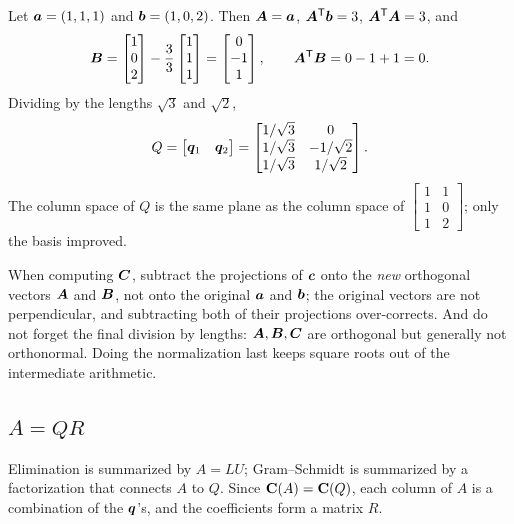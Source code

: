 \begin{example}\label{ex:u19-lecture}
Let $\boldsymbol{a}=(1,1,1)$ and $\boldsymbol{b}=(1,0,2)$. Then $\boldsymbol{A}=\boldsymbol{a}$, $\boldsymbol{A}^{\mathsf{T}}\boldsymbol{b}=3$,
$\boldsymbol{A}^{\mathsf{T}}\boldsymbol{A}=3$, and
\[
  \boldsymbol{B}=\begin{bmatrix}1\\0\\2\end{bmatrix}-\frac33\begin{bmatrix}1\\1\\1\end{bmatrix}
  =\begin{bmatrix}0\\-1\\1\end{bmatrix},
  \qquad \boldsymbol{A}^{\mathsf{T}}\boldsymbol{B}=0-1+1=0 .
\]
Dividing by the lengths $\sqrt3$ and $\sqrt2$,
\[
  Q=\begin{bmatrix}\boldsymbol{q}_1&\boldsymbol{q}_2\end{bmatrix}
  =\begin{bmatrix}1/\sqrt3&0\\1/\sqrt3&-1/\sqrt2\\1/\sqrt3&1/\sqrt2\end{bmatrix}.
\]
The column space of $Q$ is the same plane as the column space of
$\left[\begin{smallmatrix}1&1\\1&0\\1&2\end{smallmatrix}\right]$; only the basis improved.
\end{example}

\begin{trap}
When computing $\boldsymbol{C}$, subtract the projections of $\boldsymbol{c}$ onto the \emph{new} orthogonal
vectors $\boldsymbol{A}$ and $\boldsymbol{B}$, not onto the original $\boldsymbol{a}$ and $\boldsymbol{b}$; the original
vectors are not perpendicular, and subtracting both of their projections over-corrects.
And do not forget the final division by lengths: $\boldsymbol{A},\boldsymbol{B},\boldsymbol{C}$ are orthogonal but
generally not orthonormal. Doing the normalization last keeps square roots out of the
intermediate arithmetic.
\end{trap}

\subsection{\texorpdfstring{$A=QR$}{A = QR}}

Elimination is summarized by $A=LU$; Gram--Schmidt is summarized by a factorization that
connects $A$ to $Q$. Since $\mathbf{C}(A)=\mathbf{C}(Q)$, each column of $A$ is a combination of the
$\boldsymbol{q}$'s, and the coefficients form a matrix $R$.

